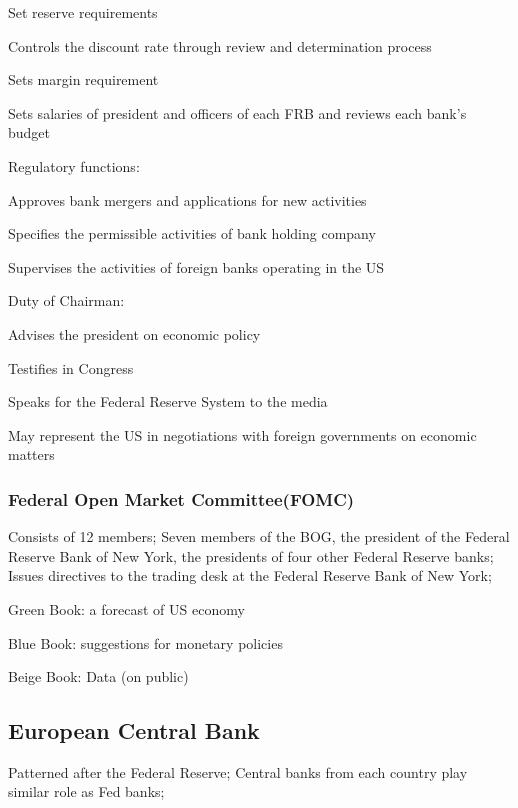 \documentclass[10pt, a4paper]{article}
\begin{document}
            \quad \quad Set reserve requirements 

            \quad \quad Controls the discount rate through review and determination process 

            \quad Sets margin requirement 

            \quad Sets salaries of president and officers of each FRB and reviews each bank's budget
            
            \quad Regulatory functions:

            \quad\quad Approves bank mergers and applications for new activities 

            \quad\quad Specifies the permissible activities of bank holding company 

            \quad\quad Supervises the activities of foreign banks operating in the US 

        \medskip
        \medskip

        Duty of Chairman: 

            \quad Advises the president on economic policy 
            
            \quad Testifies in Congress 

            \quad Speaks for the Federal Reserve System to the media 

            \quad May represent the US in  negotiations with foreign governments on economic matters
    
        \subsubsection{Federal Open Market Committee(FOMC)}
            Consists of 12 members; Seven members of the BOG, the president of the Federal Reserve Bank of New York, the presidents  of four other Federal Reserve banks; Issues directives to the trading desk at the Federal Reserve Bank of New York;

            Green Book: a forecast of US economy 

            Blue Book: suggestions for monetary policies

            Beige Book: Data (on public)
    
    \subsection{European Central Bank}
        Patterned after the Federal Reserve; Central banks from each country play similar role as Fed banks;
\end{document}
